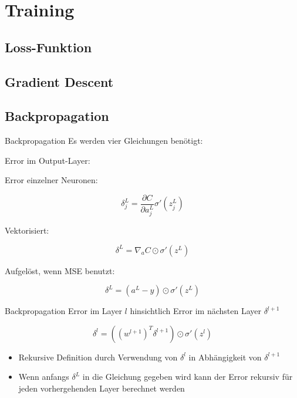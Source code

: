 \documentclass[aspectratio=169, 10pt]{beamer}
\begin{document}
\section{Training}
\label{sec:train}

\subsection{Loss-Funktion}
\label{sec:loss}



\subsection{Gradient Descent}
\label{sec:graddesc}



\subsection{Backpropagation}
\label{sec:backprop}

\begin{frame}{Backpropagation}
  Es werden vier Gleichungen benötigt:

  Error im Output-Layer:

  Error einzelner Neuronen:

  \[\delta_j^L = \frac{\partial C}{\partial a_j^L} \sigma' \left(z_j^L\right)\]

  Vektorisiert:

  \[\delta^L = \nabla_aC \odot \sigma'(z^L)\]

  Aufgelöst, wenn MSE benutzt:

  \[\delta^L = (a^L - y) \odot \sigma'(z^L)\]
\end{frame}

\begin{frame}{Backpropagation}
  Error im Layer \(l\) hinsichtlich Error im nächsten Layer \(\delta^{l+1}\)

  \[\delta^l = \left(\left(w^{l+1}\right)^T\delta^{l+1}\right) \odot
    \sigma'\left(z^l\right)\]

  \begin{itemize}
  \item Rekursive Definition durch Verwendung von \(\delta^l\) in Abhängigkeit
    von \(\delta^{l+1}\)
  \item Wenn anfangs \(\delta^L\) in die Gleichung gegeben wird kann der Error
    rekursiv für jeden vorhergehenden Layer berechnet werden
  \end{itemize}
\end{frame}
\end{document}
